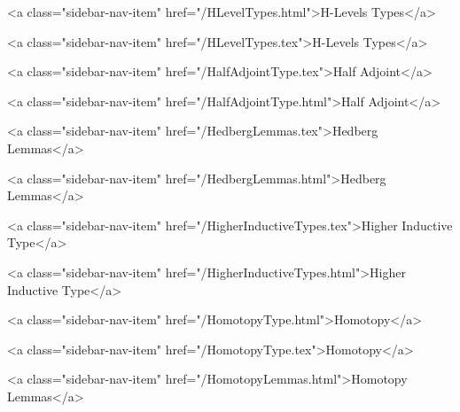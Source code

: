       
        
          <a class="sidebar-nav-item" href="/HLevelTypes.html">H-Levels Types</a>
        
      
    
      
        
          <a class="sidebar-nav-item" href="/HLevelTypes.tex">H-Levels Types</a>
        
      
    
      
        
          <a class="sidebar-nav-item" href="/HalfAdjointType.tex">Half Adjoint</a>
        
      
    
      
        
          <a class="sidebar-nav-item" href="/HalfAdjointType.html">Half Adjoint</a>
        
      
    
      
        
          <a class="sidebar-nav-item" href="/HedbergLemmas.tex">Hedberg Lemmas</a>
        
      
    
      
        
          <a class="sidebar-nav-item" href="/HedbergLemmas.html">Hedberg Lemmas</a>
        
      
    
      
        
          <a class="sidebar-nav-item" href="/HigherInductiveTypes.tex">Higher Inductive Type</a>
        
      
    
      
        
          <a class="sidebar-nav-item" href="/HigherInductiveTypes.html">Higher Inductive Type</a>
        
      
    
      
        
          <a class="sidebar-nav-item" href="/HomotopyType.html">Homotopy</a>
        
      
    
      
        
          <a class="sidebar-nav-item" href="/HomotopyType.tex">Homotopy</a>
        
      
    
      
        
          <a class="sidebar-nav-item" href="/HomotopyLemmas.html">Homotopy Lemmas</a>
        
